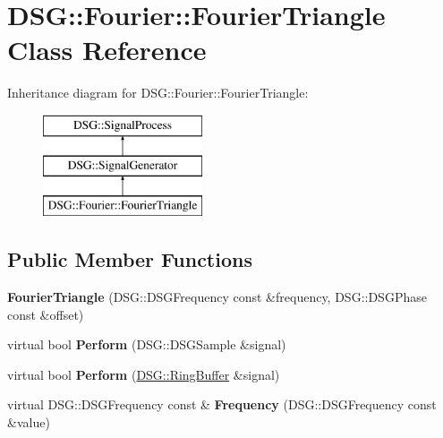 \hypertarget{class_d_s_g_1_1_fourier_1_1_fourier_triangle}{\section{D\+S\+G\+:\+:Fourier\+:\+:Fourier\+Triangle Class Reference}
\label{class_d_s_g_1_1_fourier_1_1_fourier_triangle}
}
Inheritance diagram for D\+S\+G\+:\+:Fourier\+:\+:Fourier\+Triangle\+:\begin{figure}[H]
\begin{center}
\leavevmode
\includegraphics[height=3.000000cm]{class_d_s_g_1_1_fourier_1_1_fourier_triangle}
\end{center}
\end{figure}
\subsection*{Public Member Functions}
\begin{DoxyCompactItemize}
\item 
\hypertarget{class_d_s_g_1_1_fourier_1_1_fourier_triangle_abf887c6f5aada92780224511988cb688}{{\bfseries Fourier\+Triangle} (D\+S\+G\+::\+D\+S\+G\+Frequency const \&frequency, D\+S\+G\+::\+D\+S\+G\+Phase const \&offset)}\label{class_d_s_g_1_1_fourier_1_1_fourier_triangle_abf887c6f5aada92780224511988cb688}

\item 
\hypertarget{class_d_s_g_1_1_fourier_1_1_fourier_triangle_ab5b947c1fc1f34a461c863b18e3e877d}{virtual bool {\bfseries Perform} (D\+S\+G\+::\+D\+S\+G\+Sample \&signal)}\label{class_d_s_g_1_1_fourier_1_1_fourier_triangle_ab5b947c1fc1f34a461c863b18e3e877d}

\item 
\hypertarget{class_d_s_g_1_1_fourier_1_1_fourier_triangle_a27b082e69cc7d70223dd3fbc552ba5bc}{virtual bool {\bfseries Perform} (\hyperlink{class_d_s_g_1_1_ring_buffer}{D\+S\+G\+::\+Ring\+Buffer} \&signal)}\label{class_d_s_g_1_1_fourier_1_1_fourier_triangle_a27b082e69cc7d70223dd3fbc552ba5bc}

\item 
\hypertarget{class_d_s_g_1_1_fourier_1_1_fourier_triangle_a278a51ed8af32ea371adc903b9b25039}{virtual D\+S\+G\+::\+D\+S\+G\+Frequency const \& {\bfseries Frequency} (D\+S\+G\+::\+D\+S\+G\+Frequency const \&value)}\label{class_d_s_g_1_1_fourier_1_1_fourier_triangle_a278a51ed8af32ea371adc903b9b25039}

\end{DoxyCompactItemize}
